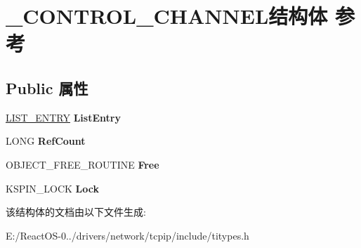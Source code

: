 \hypertarget{struct___c_o_n_t_r_o_l___c_h_a_n_n_e_l}{}\section{\+\_\+\+C\+O\+N\+T\+R\+O\+L\+\_\+\+C\+H\+A\+N\+N\+E\+L结构体 参考}
\label{struct___c_o_n_t_r_o_l___c_h_a_n_n_e_l}
\subsection*{Public 属性}
\begin{DoxyCompactItemize}
\item 
\mbox{\label{struct___c_o_n_t_r_o_l___c_h_a_n_n_e_l_ad632a3a2a415fa90c6d0881cae44d5e5}} 
\hyperlink{struct___l_i_s_t___e_n_t_r_y}{L\+I\+S\+T\+\_\+\+E\+N\+T\+RY} {\bfseries List\+Entry}
\item 
\mbox{\label{struct___c_o_n_t_r_o_l___c_h_a_n_n_e_l_aff46eb106487ab9e19ddd8c1d00d0112}} 
L\+O\+NG {\bfseries Ref\+Count}
\item 
\mbox{\label{struct___c_o_n_t_r_o_l___c_h_a_n_n_e_l_aa4105668a88b66c545842e42f4422a08}} 
O\+B\+J\+E\+C\+T\+\_\+\+F\+R\+E\+E\+\_\+\+R\+O\+U\+T\+I\+NE {\bfseries Free}
\item 
\mbox{\label{struct___c_o_n_t_r_o_l___c_h_a_n_n_e_l_afb2a526b9467354ed3b99225dac7f843}} 
K\+S\+P\+I\+N\+\_\+\+L\+O\+CK {\bfseries Lock}
\end{DoxyCompactItemize}


该结构体的文档由以下文件生成\+:\begin{DoxyCompactItemize}
\item 
E\+:/\+React\+O\+S-\/0../drivers/network/tcpip/include/titypes.\+h\end{DoxyCompactItemize}
